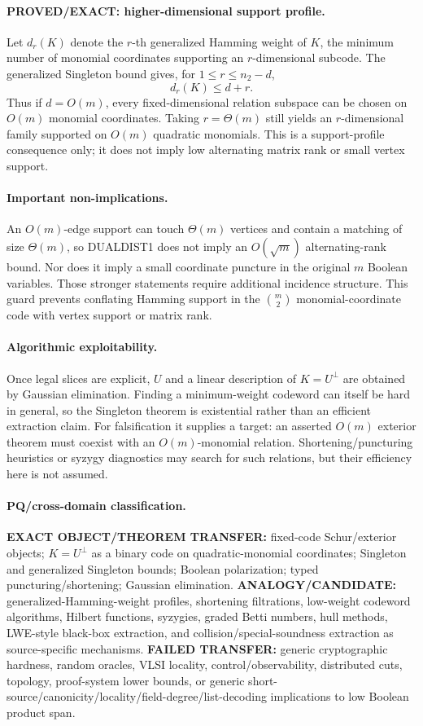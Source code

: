 \documentclass[11pt]{article}
\begin{document}
\paragraph{PROVED/EXACT: higher-dimensional support profile.}
Let \(d_r(K)\) denote the \(r\)-th generalized Hamming weight of \(K\), the minimum number of monomial coordinates supporting an \(r\)-dimensional subcode. The generalized Singleton bound gives, for \(1\le r\le n_2-d\),
\[
\boxed{d_r(K)\le d+r.}
\]
Thus if \(d=O(m)\), every fixed-dimensional relation subspace can be chosen on \(O(m)\) monomial coordinates. Taking \(r=\Theta(m)\) still yields an \(r\)-dimensional family supported on \(O(m)\) quadratic monomials. This is a support-profile consequence only; it does not imply low alternating matrix rank or small vertex support.

\paragraph{Important non-implications.}
An \(O(m)\)-edge support can touch \(\Theta(m)\) vertices and contain a matching of size \(\Theta(m)\), so DUALDIST1 does not imply an \(O(\sqrt m)\) alternating-rank bound. Nor does it imply a small coordinate puncture in the original \(m\) Boolean variables. Those stronger statements require additional incidence structure. This guard prevents conflating Hamming support in the \(\binom m2\) monomial-coordinate code with vertex support or matrix rank.

\paragraph{Algorithmic exploitability.}
Once legal slices are explicit, \(U\) and a linear description of \(K=U^\perp\) are obtained by Gaussian elimination. Finding a minimum-weight codeword can itself be hard in general, so the Singleton theorem is existential rather than an efficient extraction claim. For falsification it supplies a target: an asserted \(O(m)\) exterior theorem must coexist with an \(O(m)\)-monomial relation. Shortening/puncturing heuristics or syzygy diagnostics may search for such relations, but their efficiency here is not assumed.

\paragraph{PQ/cross-domain classification.}
\textbf{EXACT OBJECT/THEOREM TRANSFER:} fixed-code Schur/exterior objects; \(K=U^\perp\) as a binary code on quadratic-monomial coordinates; Singleton and generalized Singleton bounds; Boolean polarization; typed puncturing/shortening; Gaussian elimination.
\textbf{ANALOGY/CANDIDATE:} generalized-Hamming-weight profiles, shortening filtrations, low-weight codeword algorithms, Hilbert functions, syzygies, graded Betti numbers, hull methods, LWE-style black-box extraction, and collision/special-soundness extraction as source-specific mechanisms.
\textbf{FAILED TRANSFER:} generic cryptographic hardness, random oracles, VLSI locality, control/observability, distributed cuts, topology, proof-system lower bounds, or generic short-source/canonicity/locality/field-degree/list-decoding implications to low Boolean product span.
\end{document}
